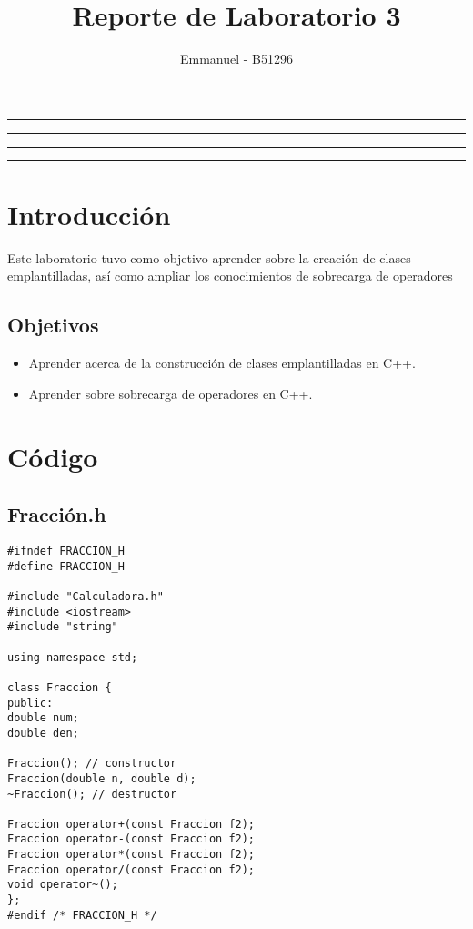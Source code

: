 \documentclass[11pt]{article}
\title{Reporte de Laboratorio 3}
\author{Emmanuel - B51296}
\begin{document}
\maketitle
\hrule
\hrule
\tableofcontents
\hspace{5mm}
\hrule
\hrule


\section{Introducción}
Este laboratorio tuvo como objetivo aprender sobre la creación de clases emplantilladas, así como ampliar los conocimientos de sobrecarga de operadores
\subsection{Objetivos}
\begin{itemize}
	\item Aprender acerca de la construcción de clases emplantilladas en C++.
	\item Aprender sobre sobrecarga de operadores en C++.
\end{itemize}

\section{Código}

\subsection{Fracción.h}
\begin{lstlisting}
#ifndef FRACCION_H
#define FRACCION_H

#include "Calculadora.h"
#include <iostream>
#include "string"

using namespace std;

class Fraccion {
public:	
double num;	
double den;	

Fraccion();	// constructor
Fraccion(double n, double d);
~Fraccion(); // destructor

Fraccion operator+(const Fraccion f2);
Fraccion operator-(const Fraccion f2);
Fraccion operator*(const Fraccion f2);
Fraccion operator/(const Fraccion f2);
void operator~();
};
#endif /* FRACCION_H */

\end{lstlisting}
\end{document}
